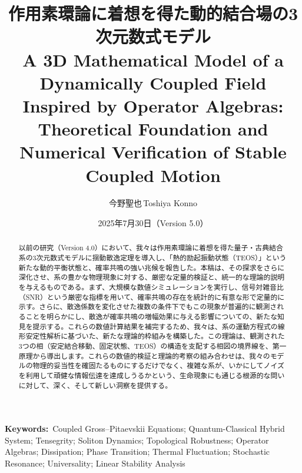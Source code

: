 \documentclass[a4paper,11pt,ja=standard,lualatex]{bxjsarticle}
\title{作用素環論に着想を得た動的結合場の3次元数式モデル\\
\large A 3D Mathematical Model of a Dynamically Coupled Field Inspired by Operator Algebras: Theoretical Foundation and Numerical Verification of Stable Coupled Motion}
\author[1]{今野聖也\,Toshiya Konno}
\affil[1]{Independent Researcher\\\href{mailto:ktlifeisonlyreallyoverafter60@gmail.com}{ktlifeisonlyreallyoverafter60@gmail.com}}
\date{2025年7月30日（Version 5.0）}
\begin{document}
\maketitle

\noindent\textbf{Keywords:}\ Coupled Gross–Pitaevskii Equations; Quantum-Classical Hybrid System; Tensegrity; Soliton Dynamics; Topological Robustness; Operator Algebras; Dissipation; Phase Transition; Thermal Fluctuation; Stochastic Resonance; Universality; Linear Stability Analysis

\begin{abstract}
\noindent 以前の研究（Version 4.0）において、我々は作用素環論に着想を得た量子・古典結合系の3次元数式モデルに揺動散逸定理を導入し、「熱的励起振動状態（TEOS）」という新たな動的平衡状態と、確率共鳴の強い兆候を報告した。本稿は、その探求をさらに深化させ、系の豊かな物理現象に対する、厳密な定量的検証と、統一的な理論的説明を与えるものである。まず、大規模な数値シミュレーションを実行し、信号対雑音比（SNR）という厳密な指標を用いて、確率共鳴の存在を統計的に有意な形で定量的に示す。さらに、散逸係数を変化させた複数の条件下でもこの現象が普遍的に観測されることを明らかにし、散逸が確率共鳴の増幅効果に与える影響についての、新たな知見を提示する。これらの数値計算結果を補完するため、我々は、系の運動方程式の線形安定性解析に基づいた、新たな理論的枠組みを構築した。この理論は、観測された3つの相（安定結合移動、固定状態、TEOS）の構造を支配する相図の境界線を、第一原理から導出します。これらの数値的検証と理論的考察の組み合わせは、我々のモデルの物理的妥当性を確固たるものにするだけでなく、複雑な系が、いかにしてノイズを利用して頑健な情報伝達を達成しうるかという、生命現象にも通じる根源的な問いに対して、深く、そして新しい洞察を提供する。
\end{abstract}
\end{document}
